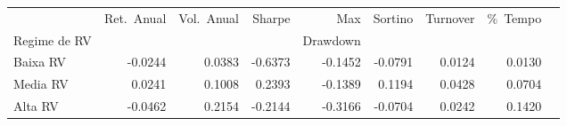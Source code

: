 \begin{tabular}{lrrrrrrrr}
\toprule
 & Ret.\ Anual & Vol.\ Anual & Sharpe & Max & Sortino & Turnover & \%\ Tempo \\
Regime de RV &  &  &  & Drawdown &  &  &  \\
\midrule
Baixa RV & -0.0244 & 0.0383 & -0.6373 & -0.1452 & -0.0791 & 0.0124 & 0.0130 \\
Media RV & 0.0241 & 0.1008 & 0.2393 & -0.1389 & 0.1194 & 0.0428 & 0.0704 \\
Alta RV & -0.0462 & 0.2154 & -0.2144 & -0.3166 & -0.0704 & 0.0242 & 0.1420 \\
\bottomrule
\end{tabular}